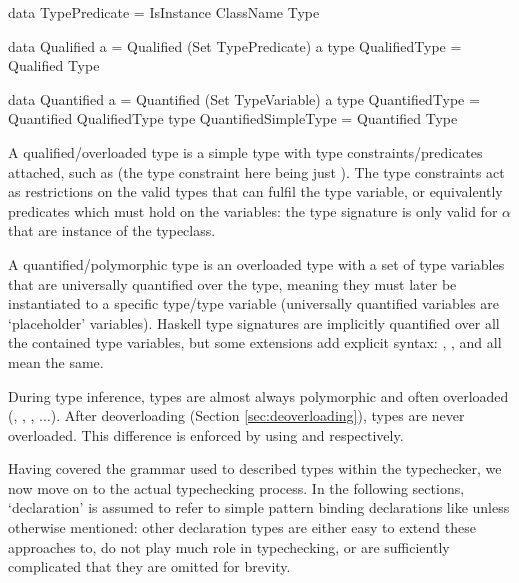 \documentclass[dissertation.tex]{subfiles}
\begin{document}
{{        \begin{haskellfigure}
        data TypePredicate = IsInstance ClassName Type

        data Qualified a = Qualified (Set TypePredicate) a
        type QualifiedType = Qualified Type

        data Quantified a = Quantified (Set TypeVariable) a
        type QuantifiedType = Quantified QualifiedType
        type QuantifiedSimpleType = Quantified Type
        \end{haskellfigure}

        A qualified/overloaded type is a simple type with type constraints/predicates attached, such as  (the type constraint here being just ). The type constraints act as restrictions on the valid types that can fulfil the type variable, or equivalently predicates which must hold on the variables: the type signature is only valid for \(\alpha\) that are instance of the  typeclass. 

        A quantified/polymorphic type is an overloaded type with a set of type variables that are universally quantified over the type, meaning they must later be instantiated to a specific type/type variable (universally quantified variables are `placeholder' variables). Haskell type signatures are implicitly quantified over all the contained type variables, but some extensions add explicit syntax: , , and  all mean the same.

        During type inference, types are almost always polymorphic and often overloaded (, , , ...). After deoverloading (Section \ref{sec:deoverloading}), types are never overloaded. This difference is enforced by using  and  respectively.

        Having covered the grammar used to described types within the typechecker, we now move on to the actual typechecking process. In the following sections, `declaration' is assumed to refer to simple pattern binding declarations like  unless otherwise mentioned: other declaration types are either easy to extend these approaches to, do not play much role in typechecking, or are sufficiently complicated that they are omitted for brevity.
    }
}
\end{document}
